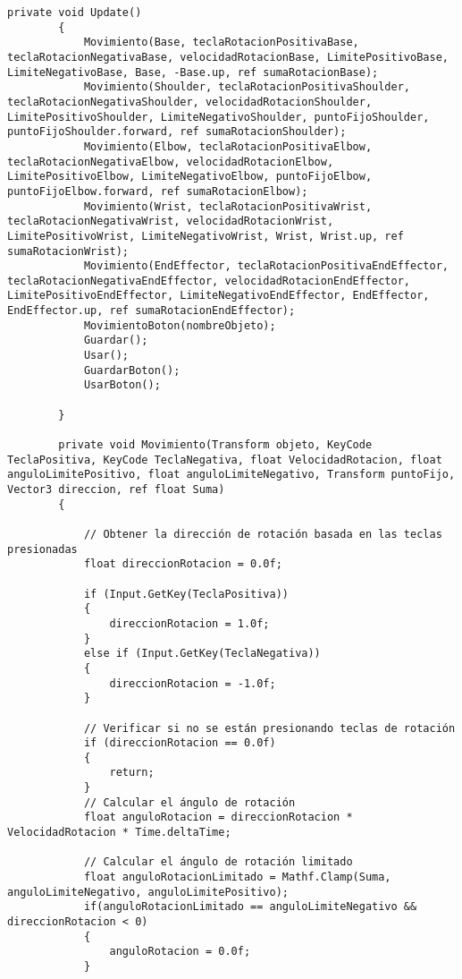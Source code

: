 \begin{lstlisting}[frame=single]
        private void Update()
        {
            Movimiento(Base, teclaRotacionPositivaBase, teclaRotacionNegativaBase, velocidadRotacionBase, LimitePositivoBase, LimiteNegativoBase, Base, -Base.up, ref sumaRotacionBase);
            Movimiento(Shoulder, teclaRotacionPositivaShoulder, teclaRotacionNegativaShoulder, velocidadRotacionShoulder, LimitePositivoShoulder, LimiteNegativoShoulder, puntoFijoShoulder, puntoFijoShoulder.forward, ref sumaRotacionShoulder);
            Movimiento(Elbow, teclaRotacionPositivaElbow, teclaRotacionNegativaElbow, velocidadRotacionElbow, LimitePositivoElbow, LimiteNegativoElbow, puntoFijoElbow, puntoFijoElbow.forward, ref sumaRotacionElbow);
            Movimiento(Wrist, teclaRotacionPositivaWrist, teclaRotacionNegativaWrist, velocidadRotacionWrist, LimitePositivoWrist, LimiteNegativoWrist, Wrist, Wrist.up, ref sumaRotacionWrist);
            Movimiento(EndEffector, teclaRotacionPositivaEndEffector, teclaRotacionNegativaEndEffector, velocidadRotacionEndEffector, LimitePositivoEndEffector, LimiteNegativoEndEffector, EndEffector, EndEffector.up, ref sumaRotacionEndEffector);
            MovimientoBoton(nombreObjeto);
            Guardar();
            Usar();
            GuardarBoton();
            UsarBoton();
            
        }
    
        private void Movimiento(Transform objeto, KeyCode TeclaPositiva, KeyCode TeclaNegativa, float VelocidadRotacion, float anguloLimitePositivo, float anguloLimiteNegativo, Transform puntoFijo, Vector3 direccion, ref float Suma)
        {
            
            // Obtener la dirección de rotación basada en las teclas presionadas
            float direccionRotacion = 0.0f;

            if (Input.GetKey(TeclaPositiva))
            {
                direccionRotacion = 1.0f;
            }
            else if (Input.GetKey(TeclaNegativa))
            {
                direccionRotacion = -1.0f;
            }

            // Verificar si no se están presionando teclas de rotación
            if (direccionRotacion == 0.0f)
            {
                return;
            }
            // Calcular el ángulo de rotación
            float anguloRotacion = direccionRotacion * VelocidadRotacion * Time.deltaTime;
            
            // Calcular el ángulo de rotación limitado
            float anguloRotacionLimitado = Mathf.Clamp(Suma, anguloLimiteNegativo, anguloLimitePositivo);
            if(anguloRotacionLimitado == anguloLimiteNegativo && direccionRotacion < 0)
            {
                anguloRotacion = 0.0f;
            }


\end{lstlisting}
